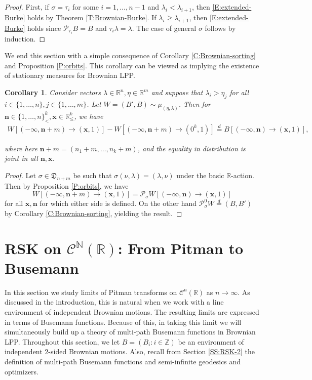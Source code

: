 \documentclass[11pt]{article}
\newcommand{\Z}{\mathbb{Z}}
\newcommand{\N}{\mathbb{N}}
\newcommand{\R}{\mathbb{R}}
\newcommand{\sig}{\sigma}
\newcommand{\la}{\lambda}
\newcommand{\cC}{\mathcal{C}}
\newcommand{\cP}{\mathcal{P}}
\newcommand{\eqd}{\stackrel{d}{=}}
\newcommand{\bx}{\mathbf{x}}
\newcommand{\bn}{\mathbf{n}}
\newtheorem{corollary}[theorem]{Corollary}
\theoremstyle{definition} %
\theoremstyle{remark} %
\begin{document}
\begin{proof}
	First, if $\sig = \tau_i$ for some $i = 1, \dots, n-1$ and $\la_i < \la_{i+1}$, then \eqref{E:extended-Burke} holds by Theorem \ref{T:Brownian-Burke}. If $\la_i \ge \la_{i+1}$, then \eqref{E:extended-Burke} holds since $\cP_{\tau_i} B = B$ and $\tau_i \la = \la$. The case of general $\sig$ follows by induction.
\end{proof}

We end this section with a simple consequence of Corollary \ref{C:Brownian-sorting} and Proposition \ref{P:orbits}. This corollary can be viewed as implying the existence of stationary measures for Brownian LPP.

\begin{corollary}
	\label{C:existence-of-stationary}
	Consider vectors $\la \in \R^n, \eta \in \R^m$ and suppose that $\la_i > \eta_j$ for all $i \in \{1, \dots, n\}, j \in \{1, \dots, m\}$. Let $W = (B', B) \sim \mu_{(\eta ,\la)}$. Then for $\bn \in \{1, \dots,n\}^k_<, \bx \in \R^k_\le$, we have
	\begin{align*}
		W[(-\infty, \bn + m) \to (\bx, 1)] - W[(-\infty, \bn + m) \to (0^k, 1)]   \eqd
		B[(-\infty, \bn) \to (\bx, 1)],
	\end{align*}
	
	where here $\bn + m = (n_1 + m, \dots, n_k+m)$, and the equality in distribution is joint in all $\bn, \bx$.
\end{corollary}

\begin{proof}
	Let $\sig \in \mathfrak{D}_{n + m}$ be such that $\sig (\nu, \la) = (\la, \nu)$ under the basic $\R$-action. Then by Proposition \ref{P:orbits}, we have
	$$
	W[(-\infty, \bn + m) \to (\bx, 1)] = \cP_\sig W[(-\infty, \bn) \to (\bx, 1)]
	$$
	for all $\bx, \bn$ for which either side is defined. On the other hand $\cP_\sig^0 W \eqd (B, B')$ by Corollary \ref{C:Brownian-sorting}, yielding the result.
\end{proof}





\section{RSK on \texorpdfstring{$\cC^\N(\R)$}{}: From Pitman to Busemann}
\label{S:Pitman-Brownian}

In this section we study limits of Pitman transforms on $\cC^n(\R)$ as $n \to \infty$. As discussed in the introduction, this is natural when we work with a line environment of independent Brownian motions. The resulting limits are expressed in terms of Busemann functions. Because of this, in taking this limit we will simultaneously build up a theory of multi-path Busemann functions in Brownian LPP. Throughout this section, we let $B = (B_i : i \in \Z)$ be an environment of independent $2$-sided Brownian motions. Also, recall from Section \ref{SS:RSK-2} the definition of multi-path Busemann functions and semi-infinite geodesics and optimizers.
\end{document}
